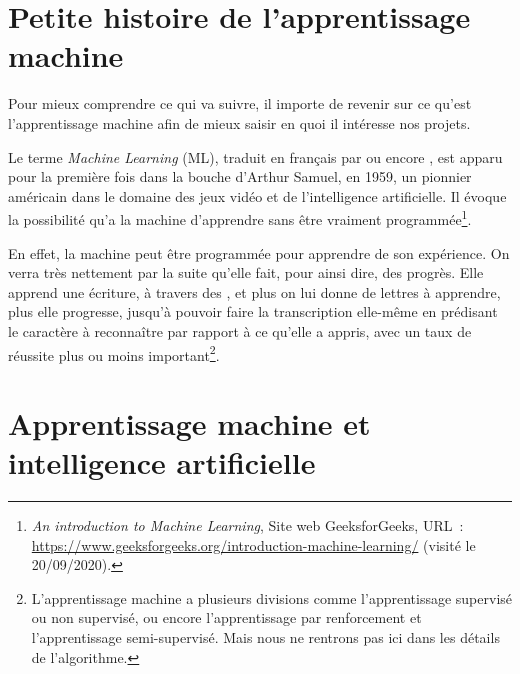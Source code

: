 \section{Petite histoire de l'apprentissage machine}

Pour mieux comprendre ce qui va suivre, il importe de revenir sur ce qu'est l'apprentissage machine afin de mieux saisir en quoi il intéresse nos projets.

Le terme \emph{Machine Learning} (ML), traduit en français par  ou encore , est apparu pour la première fois dans la bouche d'Arthur Samuel, en 1959, un pionnier américain dans le domaine des jeux vidéo et de l'intelligence artificielle. Il évoque la possibilité qu'a la machine d'apprendre sans être vraiment programmée\footnote{\emph{An introduction to Machine Learning}, Site web GeeksforGeeks, URL~: \url{https://www.geeksforgeeks.org/introduction-machine-learning/} (visité le 20/09/2020). }.

En effet, la machine peut être programmée pour apprendre de son expérience. On verra très nettement par la suite qu'elle fait, pour ainsi dire, des progrès. Elle apprend une écriture, à travers des , et plus on lui donne de lettres à apprendre, plus elle progresse, jusqu'à pouvoir faire la transcription elle-même en prédisant le caractère à reconnaître par rapport à ce qu'elle a appris, avec un taux de réussite plus ou moins important\footnote{L'apprentissage machine a plusieurs divisions comme l'apprentissage supervisé ou non supervisé, ou encore l'apprentissage par renforcement et l'apprentissage semi-supervisé. Mais nous ne rentrons pas ici dans les détails de l'algorithme.}. 

\section{Apprentissage machine et intelligence artificielle}

